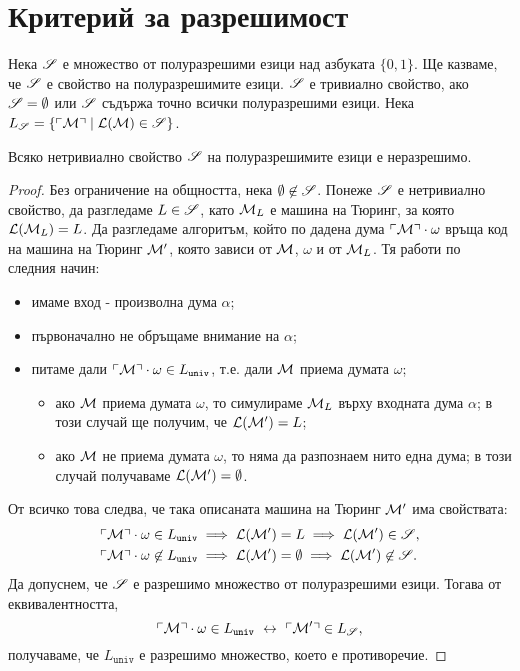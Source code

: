 \section{Критерий за разрешимост}

Нека $\mathscr{S}$ е множество от полуразрешими езици над азбуката $\{0,1\}$.
Ще казваме, че $\mathscr{S}$ е свойство на полуразрешимите езици.
$\mathscr{S}$ е тривиално свойство, ако $\mathscr{S} = \emptyset$ или $\mathscr{S}$ съдържа точно всички полуразрешими езици.
Нека $L_{\mathscr{S}} = \{\ulcorner{\mathcal{M}}\urcorner \mid \mathcal{L}(\mathcal{M}) \in \mathscr{S}\}$.

\begin{thm}
  Всяко нетривиално свойство $\mathscr{S}$ на полуразрешимите езици е неразрешимо.
\end{thm}
\begin{proof}
  Без ограничение на общността, нека $\emptyset \not\in \mathscr{S}$.
  Понеже $\mathscr{S}$ е нетривиално свойство, да разгледаме $L \in \mathscr{S}$,
  като $\mathcal{M}_L$ е машина на Тюринг, за която $\mathcal{L}(\mathcal{M}_L) = L$.
  Да разгледаме алгоритъм, който по дадена дума $\ulcorner{\mathcal{M}}\urcorner\cdot\omega$
  връща код на машина на Тюринг $\mathcal{M}'$, която зависи от $\mathcal{M}$, $\omega$ и от $\mathcal{M}_L$.
  Тя работи по следния начин:
  \begin{itemize}
  \item
    имаме вход - произволна дума $\alpha$;
  \item
    първоначално не обръщаме внимание на $\alpha$;
  \item
    питаме дали $\ulcorner{\mathcal{M}}\urcorner\cdot\omega \in L_{\texttt{univ}}$, т.е. дали $\mathcal{M}$ приема думата $\omega$;
    \begin{itemize}
    \item
      ако $\mathcal{M}$ приема думата $\omega$, то симулираме $\mathcal{M}_L$ върху входната дума $\alpha$;
      в този случай ще получим, че $\mathcal{L}(\mathcal{M}') = L$;
    \item
      ако $\mathcal{M}$ не приема думата $\omega$, то няма да разпознаем нито една дума;
      в този случай получаваме $\mathcal{L}(\mathcal{M}') = \emptyset$.      
    \end{itemize}
  \end{itemize}
  От всичко това следва, че така описаната машина на Тюринг $\mathcal{M}'$ има свойствата:
  \begin{align*}
    & \ulcorner{\mathcal{M}}\urcorner\cdot\omega \in L_{\texttt{univ}} \implies \mathcal{L}(\mathcal{M}') = L \implies \mathcal{L}(\mathcal{M}') \in \mathscr{S},\\
    & \ulcorner{\mathcal{M}}\urcorner\cdot\omega \not\in L_{\texttt{univ}} \implies \mathcal{L}(\mathcal{M}') = \emptyset \implies \mathcal{L}(\mathcal{M}') \not\in \mathscr{S}.
  \end{align*}
  Да допуснем, че $\mathscr{S}$ е разрешимо множество от полуразрешими езици.
  Тогава от еквивалентността,
  \[\ulcorner{\mathcal{M}}\urcorner\cdot\omega \in L_{\texttt{univ}} \ \leftrightarrow\  \ulcorner{\mathcal{M}'}\urcorner \in L_{\mathscr{S}},\]
  получаваме, че $L_{\texttt{univ}}$ е разрешимо множество, което е противоречие.


\end{proof}
